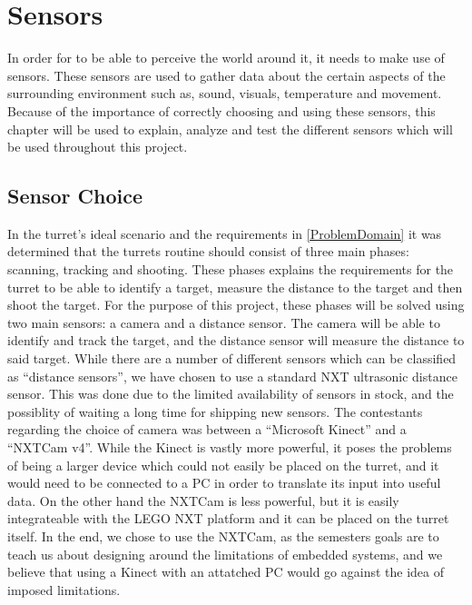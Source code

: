 \chapter{Sensors} \label{sensors}
In order for \name to be able to perceive the world around it, it needs to make
use of sensors. These sensors are used to gather data about the certain aspects
of the surrounding environment such as, sound, visuals, temperature and
movement. Because of the importance of correctly choosing and using these
sensors, this chapter will be used to explain, analyze and test the different
sensors which will be used throughout this project.

\section{Sensor Choice}
In the turret's ideal scenario and the requirements in
\autoref{ProblemDomain} it was determined that the turrets routine should
consist of three main phases: scanning, tracking and shooting. These phases explains the
requirements for the turret to be able to identify a target, measure the
distance to the target and then shoot the target. For the purpose of this
project, these phases will be solved using two main sensors: a camera and a
distance sensor. The camera will be able to identify and track the target, and
the distance sensor will measure the distance to said target. While there are a
number of different sensors which can be classified as ``distance sensors'', we
have chosen to use a standard NXT ultrasonic distance sensor. This was done due
to the limited availability of sensors in stock, and the possiblity of waiting a
long time for shipping new sensors. The contestants regarding the choice of
camera was between a ``Microsoft Kinect'' and a ``NXTCam v4''. While the Kinect
is vastly more powerful, it poses the problems of being a larger device which
could not easily be placed on the turret, and it would need to be connected to a
PC in order to translate its input into useful data. On the other hand the
NXTCam is less powerful, but it is easily integrateable with the LEGO NXT
platform and it can be placed on the turret itself. In the end, we chose to use
the NXTCam, as the semesters goals are to teach us about designing around the
limitations of embedded systems, and we believe that using a Kinect with an
attatched PC would go against the idea of imposed limitations.





% 
% 
% 
% 
